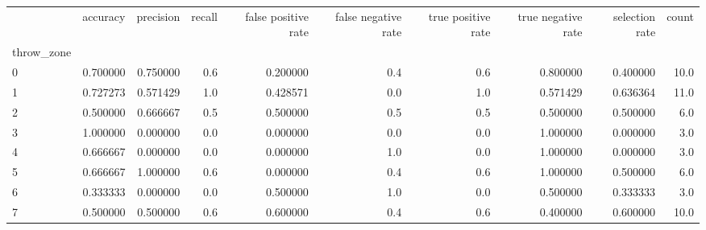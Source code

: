 \begin{tabular}{lrrrrrrrrr}
\toprule
{} &  accuracy &  precision &  recall &  false positive rate &  false negative rate &  true positive rate &  true negative rate &  selection rate &  count \\
throw\_zone &           &            &         &                      &                      &                     &                     &                 &        \\
\midrule
0          &  0.700000 &   0.750000 &     0.6 &             0.200000 &                  0.4 &                 0.6 &            0.800000 &        0.400000 &   10.0 \\
1          &  0.727273 &   0.571429 &     1.0 &             0.428571 &                  0.0 &                 1.0 &            0.571429 &        0.636364 &   11.0 \\
2          &  0.500000 &   0.666667 &     0.5 &             0.500000 &                  0.5 &                 0.5 &            0.500000 &        0.500000 &    6.0 \\
3          &  1.000000 &   0.000000 &     0.0 &             0.000000 &                  0.0 &                 0.0 &            1.000000 &        0.000000 &    3.0 \\
4          &  0.666667 &   0.000000 &     0.0 &             0.000000 &                  1.0 &                 0.0 &            1.000000 &        0.000000 &    3.0 \\
5          &  0.666667 &   1.000000 &     0.6 &             0.000000 &                  0.4 &                 0.6 &            1.000000 &        0.500000 &    6.0 \\
6          &  0.333333 &   0.000000 &     0.0 &             0.500000 &                  1.0 &                 0.0 &            0.500000 &        0.333333 &    3.0 \\
7          &  0.500000 &   0.500000 &     0.6 &             0.600000 &                  0.4 &                 0.6 &            0.400000 &        0.600000 &   10.0 \\
\bottomrule
\end{tabular}

